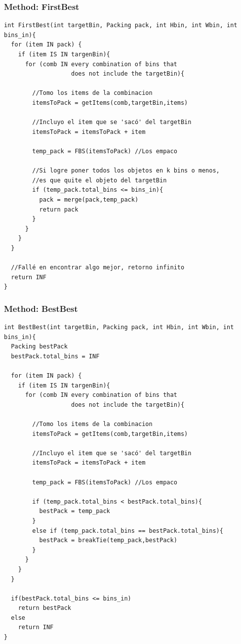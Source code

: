 \documentclass[a4paper,10pt]{article}
\begin{document}
\subsubsection{Method: FirstBest}
\begin{verbatim}
int FirstBest(int targetBin, Packing pack, int Hbin, int Wbin, int bins_in){
  for (item IN pack) {
    if (item IS IN targenBin){
      for (comb IN every combination of bins that
                   does not include the targetBin){

        //Tomo los items de la combinacion
        itemsToPack = getItems(comb,targetBin,items)

        //Incluyo el item que se 'sacó' del targetBin
        itemsToPack = itemsToPack + item

        temp_pack = FBS(itemsToPack) //Los empaco

        //Si logre poner todos los objetos en k bins o menos,
        //es que quite el objeto del targetBin
        if (temp_pack.total_bins <= bins_in){
          pack = merge(pack,temp_pack)
          return pack
        }
      }
    }
  }

  //Fallé en encontrar algo mejor, retorno infinito
  return INF
}
\end{verbatim}

\subsubsection{Method: BestBest}
\begin{verbatim}
int BestBest(int targetBin, Packing pack, int Hbin, int Wbin, int bins_in){
  Packing bestPack
  bestPack.total_bins = INF

  for (item IN pack) {
    if (item IS IN targenBin){
      for (comb IN every combination of bins that
                   does not include the targetBin){

        //Tomo los items de la combinacion
        itemsToPack = getItems(comb,targetBin,items)

        //Incluyo el item que se 'sacó' del targetBin
        itemsToPack = itemsToPack + item

        temp_pack = FBS(itemsToPack) //Los empaco

        if (temp_pack.total_bins < bestPack.total_bins){
          bestPack = temp_pack
        }
        else if (temp_pack.total_bins == bestPack.total_bins){
          bestPack = breakTie(temp_pack,bestPack)
        }
      }
    }
  }

  if(bestPack.total_bins <= bins_in)
    return bestPack
  else
    return INF
}
\end{verbatim}
\end{document}
